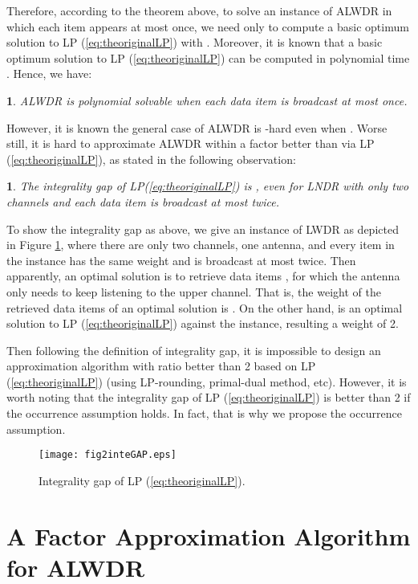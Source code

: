 \documentclass[11pt,english,onecolumn,draftcls]{IEEEtran}
\theoremstyle{plain}
\theoremstyle{plain}
\newtheorem{prop}[thm]{\protect\propositionname}
\theoremstyle{plain}
\theoremstyle{plain}
\newtheorem{cor}[thm]{\protect\corollaryname}
\providecommand{\corollaryname}{Corollary}
\providecommand{\propositionname}{Proposition}
\begin{document}
Therefore, according to the theorem above, to solve an instance of
ALWDR in which each item appears at most once, we need only
to compute a basic optimum solution to LP (\ref{eq:theoriginalLP})
with  . Moreover, it is known
that a basic optimum solution to LP (\ref{eq:theoriginalLP}) can
be computed in polynomial time \cite{korte2002combinatorial}. Hence,
we have:
\begin{cor}
\label{cor:LWDRpolynomial}ALWDR is polynomial solvable when
each data item is broadcast at most once.
\end{cor}
However, it is known the general case of ALWDR is -hard
even when . Worse still, it is hard to approximate ALWDR
within a factor better than  via LP (\ref{eq:theoriginalLP}),
as stated in the following observation:
\begin{prop}
\label{prop:The-integrality-gap}The integrality gap of LP(\ref{eq:theoriginalLP})
is , even for LNDR with only two channels and each data
item is broadcast at most twice.
\end{prop}
To show the integrality gap as above, we give an instance of LWDR
as depicted in Figure \ref{fig:Integrality-Gap-of}, where there are
only two channels, one antenna, and every item in the instance has
the same weight and is broadcast at most twice. Then apparently, an
optimal solution is to retrieve data items , for
which the antenna only needs to keep listening to the upper channel.
That is, the weight of the retrieved data items of an optimal solution
is . On the other hand, 
is an optimal solution to LP (\ref{eq:theoriginalLP}) against the
instance, resulting a weight of 2.

Then following the definition of integrality gap, it is impossible
to design an approximation algorithm with ratio better than 2 based
on LP (\ref{eq:theoriginalLP}) (using LP-rounding, primal-dual method,
etc). However, it is worth noting that the integrality gap of LP (\ref{eq:theoriginalLP})
is better than 2 if the occurrence assumption holds. In fact, that
is why we propose the occurrence assumption.

\begin{figure}
\texttt{[image: fig2inteGAP.eps]}

\protect\caption{\label{fig:Integrality-Gap-of}Integrality gap of LP (\ref{eq:theoriginalLP}). }
\end{figure}



\section{A Factor Approximation Algorithm for ALWDR}
\end{document}
